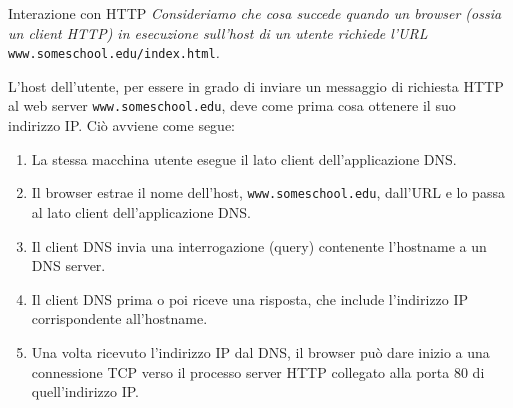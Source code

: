 \begin{Example}{Interazione con HTTP}{}
    \textit{Consideriamo che cosa succede quando un browser (ossia un client HTTP) in esecuzione sull'host di un utente richiede l'URL} \verb|www.someschool.edu/index.html|\textit{.}

    L'host dell'utente, per essere in grado di inviare un messaggio di richiesta HTTP al web server \verb|www.someschool.edu|, deve come prima cosa ottenere il suo indirizzo IP. Ciò avviene come segue:
    \begin{enumerate}
        \item La stessa macchina utente esegue il lato client dell'applicazione DNS.
        \item Il browser estrae il nome dell'host, \verb|www.someschool.edu|, dall'URL e lo passa al lato client dell'applicazione DNS.
        \item Il client DNS invia una interrogazione (query) contenente l'hostname a un DNS server.
        \item Il client DNS prima o poi riceve una risposta, che include l'indirizzo IP corrispondente all'hostname.
        \item Una volta ricevuto l'indirizzo IP dal DNS, il browser può dare inizio a una connessione TCP verso il processo server HTTP collegato alla porta 80 di quell'indirizzo IP.
    \end{enumerate}
\end{Example}

